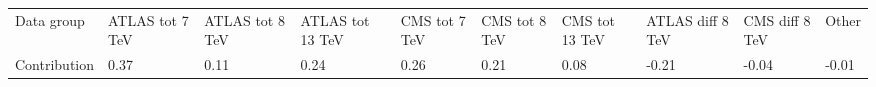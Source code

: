 \begin{table}[]
\begin{tabular}{llllllllll}
 Data group & ATLAS tot 7 TeV & ATLAS tot 8 TeV & ATLAS tot 13 TeV & CMS tot 7 TeV & CMS tot 8 TeV & CMS tot 13 TeV & ATLAS diff 8 TeV & CMS diff 8 TeV & Other \\
 Contribution & 0.37            & 0.11            & 0.24             & 0.26          & 0.21          & 0.08           & -0.21            & -0.04          & -0.01
\end{tabular}
\end{table}
